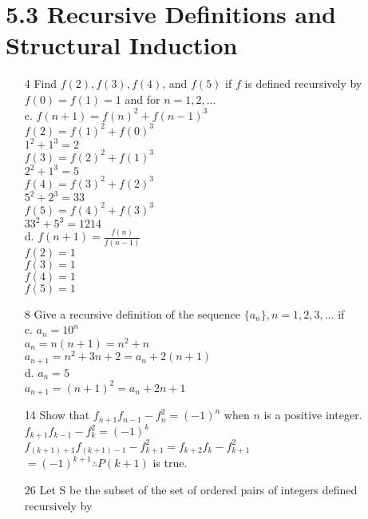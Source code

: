 \documentclass[a4paper]{article}
\newcommand\tab[1][0.5cm]{\hspace*{#1}}
\begin{document}
  \section*{5.3 Recursive Definitions and Structural Induction}
  \begin{itemize}
    \item[4] Find $f(2), f(3), f(4)$, and $f(5)$ if $f$ is defined recursively by $f(0) = f(1) = 1$ and for $n = 1, 2, \dots$ \\
      c. $f(n + 1) = f(n)^{2} + f(n - 1)^{3}$ \\
      \tab $f(2) = f(1)^{2} + f(0)^{3}$ \\
      \tab $1^{2} + 1^{3} = 2$ \\
      \tab $f(3) = f(2)^{2} + f(1)^{3}$ \\
      \tab $2^{2} + 1^{3} = 5$ \\
      \tab $f(4) = f(3)^{2} + f(2)^{3}$ \\
      \tab $5^{2} + 2^{3} = 33$ \\
      \tab $f(5) = f(4)^{2} + f(3)^{3}$ \\
      \tab $33^{2} + 5^{3} = 1214$ \\ 
      d. $f(n + 1) = \frac{f(n)}{f(n - 1)}$ \\
      \tab $f(2) = 1$ \\
      \tab $f(3) = 1$ \\
      \tab $f(4) = 1$ \\
      \tab $f(5) = 1$
    \item[8] Give a recursive definition of the sequence $\{a_{n}\}, n = 1, 2, 3, \dots$ if \\
      c. $a_{n} = 10^{n}$ \\
      \tab $a_{n} = n(n + 1) = n^{2} + n$ \\
      \tab $a_{n + 1} = n^{2} + 3n + 2 = a_{n} + 2(n + 1)$ \\
      d. $a_{n} = 5$ \\
      \tab $a_{n + 1} = (n + 1)^{2} = a_{n} + 2n + 1$ 
    \item[14] Show that $f_{n + 1}f_{n - 1} - f_{n}^{2} = (-1)^{n}$ when $n$ is a positive integer. \\
    \tab $f_{k + 1}f_{k - 1} - f_{k}^{2} = (-1)^{k}$ \\
    \tab $f_{(k + 1) + 1}f_{(k + 1) - 1} - f_{k + 1}^{2} = f_{k + 2}f_{k} - f_{k + 1}^{2}$ \\
    \tab $= (-1)^{k + 1} \therefore P(k + 1)$ is true.
    \item[26] Let S be the subset of the set of ordered pairs of integers defined recursively by \\

\end{itemize}
\end{document}
